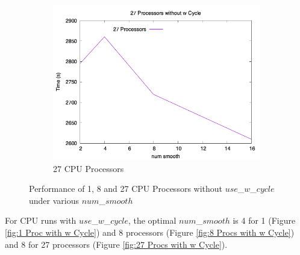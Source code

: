 \documentclass{article}
\begin{document}
\begin{figure}[H]
    \begin{subfigure}{0.48\textwidth}
        \includegraphics[width=\textwidth]{27 Proc without w Cycle.png}
        \caption{27 CPU Processors}
        \label{fig:27 Procs without w Cycle}
    \end{subfigure}
    
    \caption{Performance of 1, 8 and 27 CPU Processors without $use$\_$w$\_$cycle$ under various $num$\_$smooth$}
\end{figure}

For CPU runs with $use$\_$w$\_$cycle$, the optimal $num$\_$smooth$ is 4 for 1 (Figure \ref{fig:1 Proc with w Cycle}) and 8 processors (Figure \ref{fig:8 Procs with w Cycle}) and 8 for 27 processors (Figure \ref{fig:27 Procs with w Cycle}).
\end{document}

